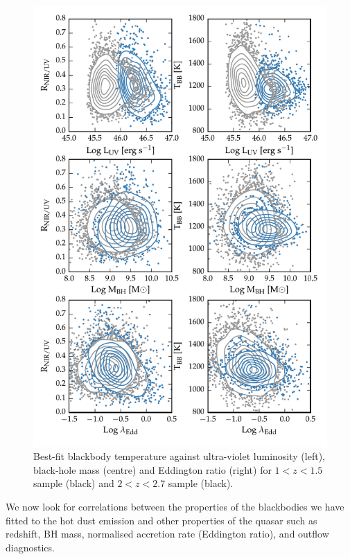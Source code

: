 \begin{figure}
  \centering
  \includegraphics[width=\textwidth]{figures/chapter05/correlations_contour.pdf}
  \caption[{Best-fit blackbody temperature against ultra-violet luminosity, black-hole mass and Eddington ratio.}]{Best-fit blackbody temperature against ultra-violet luminosity (left), black-hole mass (centre) and Eddington ratio (right) for $1 < z < 1.5$ sample (black) and $2 < z < 2.7$ sample (black).  }
  \label{fig:correlations_contour}
\end{figure}

We now look for correlations between the properties of the blackbodies we have fitted to the hot dust emission and other properties of the quasar such as redshift, BH mass, normalised accretion rate (Eddington ratio), and outflow diagnostics.  

